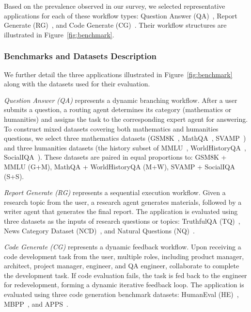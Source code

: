 \documentclass[sigplan,nonacm]{acmart}
\begin{document}
Based on the prevalence observed in our survey, we selected representative applications for each of these workflow types: Question Answer (QA)~\cite{gao2024agentscope}, Report Generate (RG)~\cite{wu2023autogenenablingnextgenllm}, and Code Generate (CG)~\cite{hong2024metagpt}. Their workflow structures are illustrated in Figure~\ref{fig:benchmark}.




\subsubsection{Benchmarks and Datasets Description}
\label{sec:motivation_description}

We further detail the three applications illustrated in Figure~\ref{fig:benchmark} along with the datasets used for their evaluation.

\textit{Question Answer (QA)} represents a dynamic branching workflow. After a user submits a question, a routing agent determines its category (mathematics or humanities) and assigns the task to the corresponding expert agent for answering. To construct mixed datasets covering both mathematics and humanities questions, we select three mathematics datasets (GSM8K~\cite{gsm8k}, MathQA~\cite{mathqa}, SVAMP~\cite{svamp}) and three humanities datasets (the history subset of MMLU~\cite{mmlu}, WorldHistoryQA~\cite{world_history_1500_qa}, SocialIQA~\cite{socialiqa}). These datasets are paired in equal proportions to:
GSM8K + MMLU (G+M), MathQA + WorldHistoryQA (M+W), SVAMP + SocialIQA (S+S).

\textit{Report Generate (RG)} represents a sequential execution workflow. Given a research topic from the user, a research agent generates materials, followed by a writer agent that generates the final report. The application is evaluated using three datasets as the inputs of research questions or topics: TruthfulQA (TQ)~\cite{truthfulqa}, News Category Dataset (NCD)~\cite{newscategorydataset}, and Natural Questions (NQ)~\cite{naturalquestion,naturalquestion_open}.

\textit{Code Generate (CG)} represents a dynamic feedback workflow. Upon receiving a code development task from the user, multiple roles, including product manager, architect, project manager, engineer, and QA engineer, collaborate to complete the development task. If code evaluation fails, the task is fed back to the engineer for redevelopment, forming a dynamic iterative feedback loop. The application is evaluated using three code generation benchmark datasets: HumanEval (HE)~\cite{humaneval}, MBPP~\cite{mbpp}, and APPS~\cite{hendrycks2021apps}.
\end{document}
